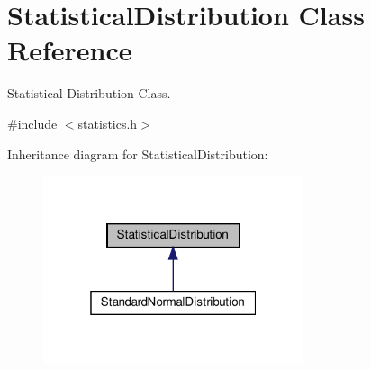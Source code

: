 \hypertarget{classStatisticalDistribution}{}\section{Statistical\+Distribution Class Reference}
\label{classStatisticalDistribution}


Statistical Distribution Class.  




{\ttfamily \#include $<$statistics.\+h$>$}



Inheritance diagram for Statistical\+Distribution\+:
\nopagebreak
\begin{figure}[H]
\begin{center}
\leavevmode
\includegraphics[width=217pt]{classStatisticalDistribution__inherit__graph}
\end{center}
\end{figure}
